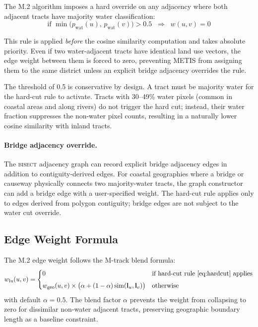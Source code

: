 The M.2 algorithm imposes a hard override on any adjacency where both
adjacent tracts have majority water classification:
\begin{equation}
  \text{if } \min\!\bigl(p_{\mathrm{wat}}(u),\, p_{\mathrm{wat}}(v)\bigr) > 0.5
  \;\;\Rightarrow\;\; w(u, v) = 0
  \label{eq:hardcut}
\end{equation}

This rule is applied \emph{before} the cosine similarity computation and
takes absolute priority.
Even if two water-adjacent tracts have identical land use vectors, the edge
weight between them is forced to zero, preventing METIS from assigning them
to the same district unless an explicit bridge adjacency overrides the rule.

The threshold of 0.5 is conservative by design.
A tract must be majority water for the hard-cut rule to activate.
Tracts with 30--49\% water pixels (common in coastal areas and along rivers)
do not trigger the hard cut; instead, their water fraction suppresses the
non-water pixel counts, resulting in a naturally lower cosine similarity
with inland tracts.

\paragraph{Bridge adjacency override.}
The \textsc{bisect} adjacency graph can record explicit bridge adjacency edges
in addition to contiguity-derived edges.
For coastal geographies where a bridge or causeway physically connects two
majority-water tracts, the graph constructor can add a bridge edge with a
user-specified weight.
The hard-cut rule applies only to edges derived from polygon contiguity;
bridge edges are not subject to the water cut override.

\subsection{Edge Weight Formula}

The M.2 edge weight follows the M-track blend formula:
\begin{equation}
  w_{\mathrm{lu}}(u, v)
  = \begin{cases}
      0 & \text{if hard-cut rule~\eqref{eq:hardcut} applies} \\[4pt]
      w_{\mathrm{geo}}(u, v) \times
        \bigl(\alpha + (1 - \alpha)\,\mathrm{sim}(\mathbf{l}_u, \mathbf{l}_v)\bigr)
      & \text{otherwise}
    \end{cases}
  \label{eq:weight}
\end{equation}
with default $\alpha = 0.5$.
The blend factor $\alpha$ prevents the weight from collapsing to zero for
dissimilar non-water adjacent tracts, preserving geographic boundary length
as a baseline constraint.

